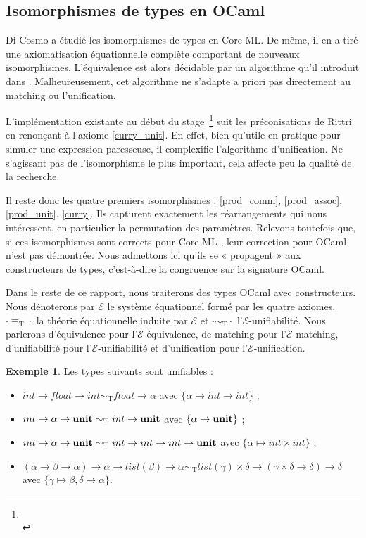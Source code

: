 \documentclass[a4paper]{report}
\theoremstyle{definition}
\newtheorem{exemple}[theoreme]{Exemple}
\newcommand{\unit}{\bold{unit}}
\newcommand{\E}{\mathscr{E}}
\newcommand{\T}{\mathrm{T}}
\newcommand\laure[1]{{\bf\color{WildStrawberry}{TODO: #1}}\\}
\begin{document}
\subsection{Isomorphismes de types en OCaml}

Di Cosmo \cite{DiCosmo92} a étudié les isomorphismes de types en Core-ML. De même, il en a tiré une axiomatisation équationnelle complète comportant de nouveaux isomorphismes. L'équivalence est alors décidable par un algorithme qu'il introduit dans \cite{DiCosmo95}. Malheureusement, cet algorithme ne s'adapte a priori pas directement au matching ou l'unification.

L'implémentation existante au début du stage~\footnote{\laure{blabla}} suit les préconisations de Rittri en renonçant à l'axiome \eqref{curry_unit}. En effet, bien qu'utile en pratique pour simuler une expression paresseuse, il complexifie l'algorithme d'unification. Ne s'agissant pas de l'isomorphisme le plus important, cela affecte peu la qualité de la recherche.

Il reste donc les quatre premiers isomorphismes : \eqref{prod_comm}, \eqref{prod_assoc}, \eqref{prod_unit}, \eqref{curry}. Ils capturent exactement les réarrangements qui nous intéressent, en particulier la permutation des paramètres. Relevons toutefois que, si ces isomorphismes sont corrects pour Core-ML \cite{DiCosmo93}, leur correction pour OCaml n'est pas démontrée. Nous admettons ici qu'ils se « propagent » aux constructeurs de types, c'est-à-dire la congruence sur la signature OCaml.

Dans le reste de ce rapport, nous traiterons des types OCaml avec constructeurs. Nous dénoterons par $\E$ le système équationnel formé par les quatre axiomes, $\cdot \equiv_\T \cdot$ la théorie équationnelle induite par $\E$ et $\cdot \sim_\T \cdot$ l'$\E$-unifiabilité. Nous parlerons d'équivalence pour l'$\E$-équivalence, de matching pour l'$\E$-matching, d'unifiabilité pour l'$\E$-unifiabilité et d'unification pour l'$\E$-unification.

\begin{exemple}
  Les types suivants sont unifiables :
  \begin{itemize}
    \item $int \rightarrow float \rightarrow int \sim_\T float \rightarrow \alpha$ avec $\{ \alpha \mapsto int \rightarrow int \}$ ;
    \item $int \rightarrow \alpha \rightarrow \unit \sim_\T int \rightarrow \unit$ avec $\{ \alpha \mapsto \unit \}$ ;
    \item $int \rightarrow \alpha \rightarrow \unit \sim_\T int \rightarrow int \rightarrow int \rightarrow \unit$ avec $\{ \alpha \mapsto int \times int \}$ ;
    \item $(\alpha \rightarrow \beta \rightarrow \alpha) \rightarrow \alpha \rightarrow list (\beta) \rightarrow \alpha \sim_\T list (\gamma) \times \delta \rightarrow (\gamma \times \delta \rightarrow \delta) \rightarrow \delta$ \\ avec $\{ \gamma \mapsto \beta, \delta \mapsto \alpha \}$.
  \end{itemize}
\end{exemple}
\end{document}
